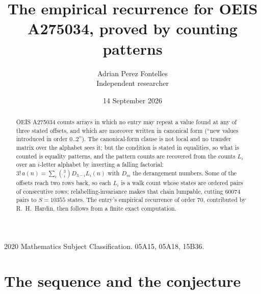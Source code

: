 \documentclass[11pt,a4paper]{article}
\title{The empirical recurrence for OEIS A275034, proved by counting patterns}
\author{Adrian Perez Fontelles\\ \small Independent researcher}
\date{14 September 2026}
\theoremstyle{plain}
\theoremstyle{definition}
\begin{document}
\maketitle

\begin{abstract}
OEIS A275034 counts arrays in which no entry may repeat a value found at any of three stated
offsets, and which are moreover written in canonical form (``new values introduced in order
$0..2$''). The canonical-form clause is not local and no transfer matrix over the
alphabet sees it; but the condition is stated in equalities, so what is counted is equality
patterns, and the pattern counts are recovered from the counts $L_i$ over an $i$-letter
alphabet by inverting a falling factorial:
$3!\,a(n)=\sum_i\binom{3}{i}D_{3-i}L_i(n)$ with $D_m$ the derangement numbers.
Some of the offsets reach two rows back, so each $L_i$ is a walk count whose states are
ordered pairs of consecutive rows; relabelling-invariance makes that chain lumpable,
cutting $60074$ pairs to $S=10355$ states. The entry's empirical recurrence of order $70$,
contributed by R.~H.~Hardin, then follows from a finite exact computation.
\end{abstract}

\noindent\small 2020 Mathematics Subject Classification. 05A15, 05A18, 15B36.\normalsize

\section{The sequence and the conjecture}
\end{document}
